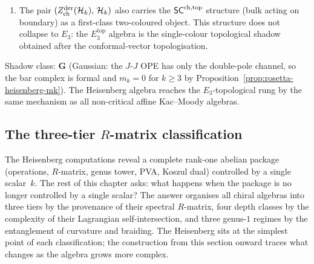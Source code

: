 \begin{remark}
\begin{enumerate}[label=\textup{(\roman*)}]
\item The pair
 $(Z^{\mathrm{der}}_{\mathrm{ch}}(\mathcal{H}_k),\, \mathcal{H}_k)$
 also carries the $\mathsf{SC}^{\mathrm{ch,top}}$ structure
 (bulk acting on boundary) as a first-class two-coloured object.
 This structure does not collapse to $E_3$: the $E_3^{\mathrm{top}}$
 algebra is the single-colour topological shadow obtained after the
 conformal-vector topologisation.
\end{enumerate}
Shadow class: $\mathbf{G}$ (Gaussian: the $J$-$J$
OPE has only the double-pole channel, so the bar complex is formal and
$m_k = 0$ for $k \ge 3$ by
Proposition~\ref{prop:rosetta-heisenberg-mk}).
The Heisenberg algebra reaches the $E_3$-topological rung by the same mechanism as all non-critical
affine Kac--Moody algebras.
\end{remark}

\subsection{The three-tier $R$-matrix classification}
\label{subsec:ordered-three-tier}

The Heisenberg computations reveal a complete rank-one abelian package
(operations, $R$-matrix, genus tower, PVA, Koszul dual) controlled by a
single scalar~$k$. The rest of this chapter asks: what
happens when the package is no longer controlled by a single scalar?
The answer organises all chiral algebras into three tiers by the
provenance of their spectral $R$-matrix, four depth classes by the
complexity of their Lagrangian self-intersection, and three
genus-$1$ regimes by the entanglement of curvature and braiding.
The Heisenberg sits at the simplest point of each classification;
the construction from this section onward traces
what changes as the algebra grows more complex.

